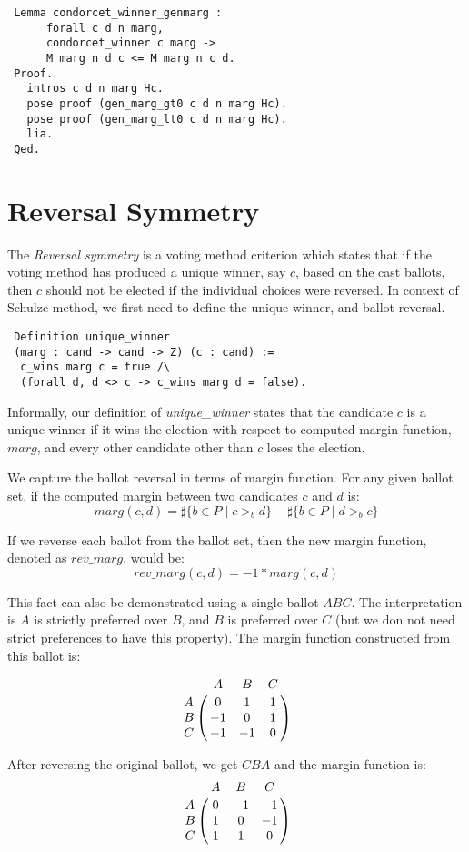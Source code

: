 \begin{verbatim}
 Lemma condorcet_winner_genmarg :
      forall c d n marg, 
      condorcet_winner c marg -> 
      M marg n d c <= M marg n c d.  
 Proof.
   intros c d n marg Hc.
   pose proof (gen_marg_gt0 c d n marg Hc).
   pose proof (gen_marg_lt0 c d n marg Hc).
   lia.
 Qed.
\end{verbatim}
   
\section{Reversal Symmetry}
 The \textit{Reversal symmetry} is a voting method criterion which states that if the voting method has produced a unique 
 winner, say $c$, based on the cast ballots, then $c$ should not be elected if the individual choices were 
 reversed. In context of Schulze method, we first need to define the unique winner, and ballot reversal. 
 
 \begin{verbatim}
 Definition unique_winner 
 (marg : cand -> cand -> Z) (c : cand) :=
  c_wins marg c = true /\
  (forall d, d <> c -> c_wins marg d = false).
\end{verbatim}  

Informally, our definition of \textit{unique\_winner} states that the candidate $c$ is a unique winner
if it wins the election with respect to computed margin function, $marg$, and every other candidate 
other than $c$ loses the election. 

We capture the ballot reversal in terms of margin function. For any given ballot set, if the computed 
margin between two candidates $c$ and $d$ is: 
\[
  marg(c, d) = \sharp \lbrace b \in P \mid c >_b d \rbrace -
            \sharp \lbrace b \in P \mid d >_b c \rbrace
\] 

If we reverse each ballot from the ballot set, then the new margin function, denoted as $rev\_marg$, would be:
\[
  rev\_marg(c, d) = -1 * marg (c, d)
\] 

This fact can also be demonstrated using a single ballot $ABC$. The interpretation is $A$ is strictly preferred over $B$, 
and $B$ is preferred over $C$ (but we don not need strict preferences to have this property). 
The margin function constructed from this ballot is: 

\[
\bordermatrix{ & A & B & C \cr
      A & 0 & 1 & 1 \cr
      B & -1 & 0 & 1 \cr
      C & -1 & -1 & 0 }
      \]
      
After reversing the original ballot, we get $CBA$ and the margin function is:
\[
\bordermatrix{ & A & B & C \cr
      A & 0 & -1 & -1 \cr
      B & 1 & 0 & -1 \cr
      C & 1 & 1 & 0 }
      \]

